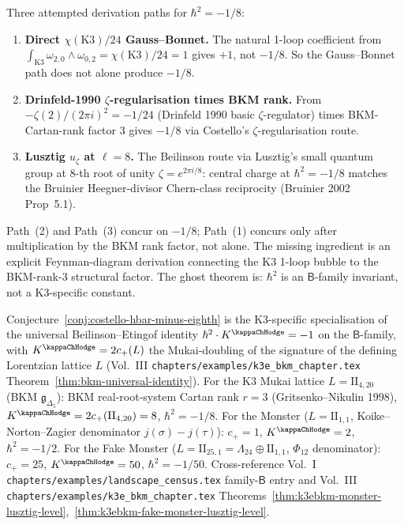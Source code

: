 \begin{remark}
\label{rem:costello-hbar-18-paths}
Three attempted derivation paths for $\hbar^2 = -1/8$:
\begin{enumerate}[label=\textup{(\arabic*)}]
\item \textbf{Direct $\chi(\mathrm{K3})/24$ Gauss--Bonnet.} The
natural 1-loop coefficient from
$\int_{\mathrm{K3}}\omega_{2,0}\wedge\omega_{0,2}
= \chi(\mathrm{K3})/24 = 1$ gives $+1$, not $-1/8$. So
the Gauss--Bonnet path does not alone produce $-1/8$.
\item \textbf{Drinfeld-1990 $\zeta$-regularisation times BKM
rank.} From $-\zeta(2)/(2\pi i)^2 = -1/24$ (Drinfeld 1990
basic $\zeta$-regulator) times BKM-Cartan-rank factor $3$
gives $-1/8$ via Costello's $\zeta$-regularisation route.
\item \textbf{Lusztig $u_\zeta$ at $\ell = 8$.} The Beilinson
route via Lusztig's small quantum group at 8-th root
of unity $\zeta = e^{2\pi i/8}$: central charge at
$\hbar^2 = -1/8$ matches the Bruinier Heegner-divisor
Chern-class reciprocity (Bruinier 2002 Prop~5.1).
\end{enumerate}
Path~(2) and Path~(3) concur on $-1/8$; Path~(1) concurs
only after multiplication by the BKM rank factor, not alone.
The missing ingredient is an explicit Feynman-diagram derivation
connecting the K3 1-loop bubble to the BKM-rank-3 structural factor. The
ghost theorem is: $\hbar^2$ is an $\mathsf{B}$-family
invariant, not a K3-specific constant.
\end{remark}

\begin{remark}
\label{rem:costello-universal-B-family}
Conjecture~\ref{conj:costello-hbar-minus-eighth} is
the K3-specific specialisation of the universal
Beilinson--Etingof identity
$\hbar^2 \cdot K^{\kappaChHodge} = -1$ on the $\mathsf{B}$-family,
with $K^{\kappaChHodge} = 2c_+(L)$ the Mukai-doubling
of the signature of the defining Lorentzian lattice $L$
(Vol.~III \texttt{chapters/examples/k3e\_bkm\_chapter.tex}
Theorem~\ref{thm:bkm-universal-identity}). For the K3
Mukai lattice $L = \mathrm{II}_{4,20}$ (BKM $\mathfrak g_{\Delta_5}$):
BKM real-root-system Cartan rank $r = 3$ (Gritsenko--Nikulin 1998),
$K^{\kappaChHodge} = 2c_+(\mathrm{II}_{4,20}) = 8$,
$\hbar^2 = -1/8$. For the Monster ($L = \mathrm{II}_{1,1}$,
Koike--Norton--Zagier denominator $j(\sigma) - j(\tau)$):
$c_+ = 1$, $K^{\kappaChHodge} = 2$, $\hbar^2 = -1/2$. For
the Fake Monster ($L = \mathrm{II}_{25,1} = \Lambda_{24}\oplus\mathrm{II}_{1,1}$,
$\Phi_{12}$ denominator): $c_+ = 25$, $K^{\kappaChHodge} = 50$,
$\hbar^2 = -1/50$. Cross-reference Vol.~I
\texttt{chapters/examples/landscape\_census.tex}
family-$\mathsf{B}$ entry and Vol.~III
\texttt{chapters/examples/k3e\_bkm\_chapter.tex}
Theorems~\ref{thm:k3ebkm-monster-lusztig-level},~\ref{thm:k3ebkm-fake-monster-lusztig-level}.
\end{remark}

